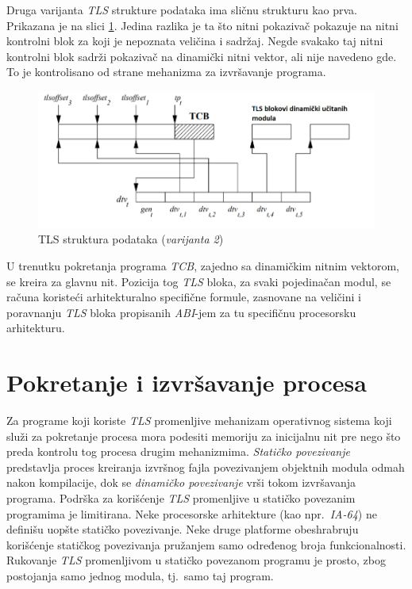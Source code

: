 \documentclass[12pt,oneside]{memoir}
\begin{document}
Druga varijanta \emph{TLS} strukture podataka ima sličnu strukturu kao prva. Prikazana je na slici \ref{fig:tls_model2}. Jedina razlika je ta što nitni pokazivač pokazuje na nitni kontrolni blok za koji je nepoznata veličina i sadržaj. Negde svakako taj nitni kontrolni blok sadrži pokazivač na dinamički nitni vektor, ali nije navedeno gde. To je kontrolisano od strane mehanizma za izvršavanje programa.

\begin{figure}[h!]
	\begin{center}
		\includegraphics[scale=0.6]{slike/TLSmodelV2.png}
	\end{center}
	\caption{TLS struktura podataka (\emph{varijanta 2})}
	\label{fig:tls_model2}
\end{figure}

U trenutku pokretanja programa \emph{TCB}, zajedno sa dinamičkim nitnim vektorom, se kreira za glavnu nit. Pozicija tog \emph{TLS} bloka, za svaki pojedinačan modul, se računa koristeći arhitekturalno specifične formule, zasnovane na veličini i poravnanju \emph{TLS} bloka propisanih \emph{ABI}-jem za tu specifičnu procesorsku arhitekturu.

\section{Pokretanje i izvršavanje procesa}
\label{sec:pokrTLS}

Za programe koji koriste \emph{TLS} promenljive mehanizam operativnog sistema koji služi za pokretanje procesa mora podesiti memoriju za inicijalnu nit pre nego što preda kontrolu tog procesa drugim mehanizmima. \emph{Statičko povezivanje} predstavlja proces kreiranja izvršnog fajla povezivanjem objektnih modula odmah nakon kompilacije, dok se \emph{dinamičko povezivanje} vrši tokom izvršavanja programa. Podrška za korišćenje \emph{TLS} promenljive u statičko povezanim programima je limitirana. Neke procesorske arhitekture (kao npr.~\emph{IA-64}) ne definišu uopšte statičko povezivanje. Neke druge platforme obeshrabruju korišćenje statičkog povezivanja pružanjem samo određenog broja funkcionalnosti. Rukovanje \emph{TLS} promenljivom u statičko povezanom programu je prosto, zbog postojanja samo jednog modula, tj.~samo taj program.
\end{document}
